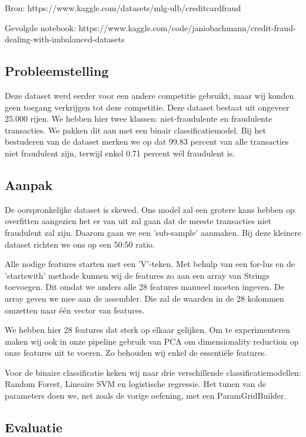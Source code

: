 \documentclass[a4paper,12pt,twoside]{report}
\begin{document}
Bron: https://www.kaggle.com/datasets/mlg-ulb/creditcardfraud

Gevolgde notebook: https://www.kaggle.com/code/janiobachmann/credit-fraud-dealing-with-imbalanced-datasets

\subsection*{Probleemstelling}

Deze dataset werd eerder voor een andere competitie gebruikt, maar wij konden geen toegang verkrijgen tot deze competitie. Deze dataset bestaat uit ongeveer 25.000 rijen. We hebben hier twee klassen: niet-fraudulente en fraudulente transacties. We pakken dit aan met een binair classificatiemodel. Bij het bestuderen van de dataset merken we op dat 99.83 percent van alle transacties niet fraudulent zijn, terwijl enkel 0.71 percent wél fraudulent is.

\subsection*{Aanpak}

De oorspronkelijke dataset is skewed. Ons model zal een grotere kans hebben op overfitten aangezien het er van uit zal gaan dat de meeste transacties niet fraudulent zal zijn. Daarom gaan we een 'sub-sample' aanmaken. Bij deze kleinere dataset richten we ons op een 50:50 ratio.

Alle nodige features starten met een 'V'-teken. Met behulp van een for-lus en de 'startswith' methode kunnen wij de features zo aan een array van Strings toevoegen. Dit omdat we anders alle 28 features manueel moeten ingeven. De array geven we mee aan de assembler. Die zal de waarden in de 28 kolommen omzetten naar één vector van features.

We hebben hier 28 features dat sterk op elkaar gelijken. Om te experimenteren maken wij ook in onze pipeline gebruik van PCA om dimensionality reduction op onze features uit te voeren. Zo behouden wij enkel de essentiële features.

Voor de binaire classificatie keken wij naar drie verschillende classificatiemodellen: Random Forest, Lineaire SVM en logistische regressie. Het tunen van de parameters doen we, net zoals de vorige oefening, met een ParamGridBuilder.

\subsection*{Evaluatie}
\end{document}
